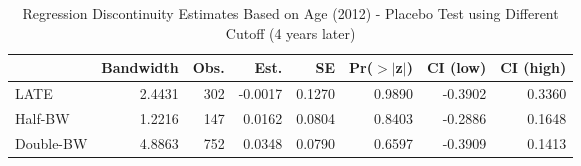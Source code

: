 \begin{table}[ht]
\centering
\begin{tabular}{lrrrrrrr}
  \hline
 & Bandwidth & Obs. & Est. & SE & Pr($>$$|$z$|$) & CI (low) & CI (high) \\ 
  \hline
LATE & 2.4431 & 302 & -0.0017 & 0.1270 & 0.9890 & -0.3902 & 0.3360 \\ 
  Half-BW & 1.2216 & 147 & 0.0162 & 0.0804 & 0.8403 & -0.2886 & 0.1648 \\ 
  Double-BW & 4.8863 & 752 & 0.0348 & 0.0790 & 0.6597 & -0.3909 & 0.1413 \\ 
   \hline
\end{tabular}
\caption{Regression Discontinuity Estimates Based on Age (2012) - Placebo Test using Different Cutoff (4 years later)} 
\label{tab:rd2012_plac}
\end{table}
